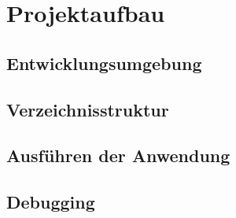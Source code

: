 \section{Projektaufbau}

\subsection{Entwicklungsumgebung}

\subsection{Verzeichnisstruktur}

\subsection{Ausführen der Anwendung}

\subsection{Debugging}